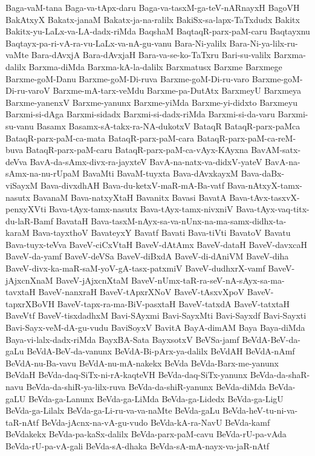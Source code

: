 {Baga-vaM-tana
Baga-va-tApx-daru
Baga-va-tasxM-ga-teV-nARnayxH
BagoVH
BakAtxyX
Bakatx-janaM
Bakatx-ja-na-ralilx
BakiSx-sa-lapx-TaTxdudx
Bakitx
Bakitx-yu-LaLx-va-LA-dadx-riMda
BaqshaM
BaqtaqR-parx-paM-caru
Baqtayxnu
Baqtayx-pa-ri-vA-ra-vu-LaLx-va-nA-gu-vanu
Bara-Ni-yalilx
Bara-Ni-ya-lilx-ru-vaMte
Bara-dAvxjA
Bara-dAvxjaH
Bara-va-se-ko-TaTxru
Bari-su-valilx
Barxma-dalilx
Barxma-diMda
Barxma-kA-la-dalilx
Barxmatusx
Barxme
Barxmege
Barxme-goM-Danu
Barxme-goM-Di-ruva
Barxme-goM-Di-ru-varo
Barxme-goM-Di-ru-varoV
Barxme-mA-tarx-veMdu
Barxme-pa-DutAtx
BarxmeyU
Barxmeya
Barxme-yanenxV
Barxme-yanunx
Barxme-yiMda
Barxme-yi-didxto
Barxmeyu
Barxmi-si-dAga
Barxmi-sidadx
Barxmi-si-dadx-riMda
Barxmi-si-da-varu
Barxmi-su-vanu
Basamx
Basamx-sA-takx-ra-NA-dukotxV
BataqR
BataqR-parx-paMca
BataqR-parx-paM-ca-mata
BataqR-parx-paM-cara
BataqR-parx-paM-ca-reM-buva
BataqR-parx-paM-caru
BataqR-parx-paM-ca-vAyx-KAyxna
BavAM-satx-deVva
BavA-da-sAmx-divx-ra-jayxteV
BavA-na-natx-va-didxV-yateV
BavA-na-sAmx-na-nu-rUpaM
BavaMti
BavaM-tuyxta
Bava-dAvxkayxM
Bava-daBx-viSayxM
Bava-divxdhAH
Bava-du-ketxV-maR-mA-Ba-vatf
Bava-nAtxyX-tamx-nasutx
BavanaM
Bava-natxyXtaH
Bavanitx
Bavasi
BavatA
Bava-tAvx-tasxvX-penxyXVti
Bava-tAyx-tamx-nasutx
Bava-tAyx-tamx-nivxniV
Bava-tAyx-vaq-titx-du-laR-Bamf
BavataH
Bava-tasxM-nAyx-sa-va-nUnx-na-ma-samx-didhx-ta-karaM
Bava-tayxthoV
BavateyxY
Bavatf
Bavati
Bava-tiVti
BavatoV
Bavatu
Bava-tuyx-teVva
BaveV-ciCxVtaH
BaveV-dAtAmx
BaveV-dataH
BaveV-davxcaH
BaveV-da-yamf
BaveV-deVSa
BaveV-diBxdA
BaveV-di-dAniVM
BaveV-diha
BaveV-divx-ka-maR-saM-yoV-gA-tasx-patxmiV
BaveV-dudhxrX-vamf
BaveV-jAjxcnXnaM
BaveV-jAjxcnXtaM
BaveV-nUmx-taR-ra-seV-nA-sAyx-sa-ma-tavxtaH
BaveV-nanxraH
BaveV-tApxrXNoV
BaveV-tAsxvXpoV
BaveV-tapxrXBoVH
BaveV-tapx-ra-ma-BiV-pasxtaH
BaveV-tatxdA
BaveV-tatxtaH
BaveVtf
BaveV-tisxdadhxM
Bavi-SAyxmi
Bavi-SayxMti
Bavi-Sayxdf
Bavi-Sayxti
Bavi-Sayx-veM-dA-gu-vudu
BaviSoyxV
BavitA
BayA-dimAM
Baya
Baya-diMda
Baya-vi-lalx-dadx-riMda
BayxBA-Sata
BayxsotxV
BeVSa-jamf
BeVdA-BeV-da-gaLu
BeVdA-BeV-da-vanunx
BeVdA-Bi-pArx-ya-dalilx
BeVdAH
BeVdA-nAmf
BeVdA-nu-Ba-vavu
BeVdA-nu-mA-nakekx
BeVda
BeVda-Barx-me-yanunx
BeVdaH
BeVda-daq-SiTx-ni-rA-kaqteVH
BeVda-daq-SiTx-yanunx
BeVda-da-shaR-navu
BeVda-da-shiR-ya-lilx-ruva
BeVda-da-shiR-yanunx
BeVda-diMda
BeVda-gaLU
BeVda-ga-Lanunx
BeVda-ga-LiMda
BeVda-ga-Lidedx
BeVda-ga-LigU
BeVda-ga-Lilalx
BeVda-ga-Li-ru-va-va-naMte
BeVda-gaLu
BeVda-heV-tu-ni-va-taR-nAtf
BeVda-jAcnx-na-vA-gu-vudo
BeVda-kA-ra-NavU
BeVda-kamf
BeVdakekx
BeVda-pa-kaSx-dalilx
BeVda-parx-paM-cavu
BeVda-rU-pa-vAda
BeVda-rU-pa-vA-gali
BeVda-sA-dhaka
BeVda-sA-mA-nayx-va-jaR-nAtf
}
